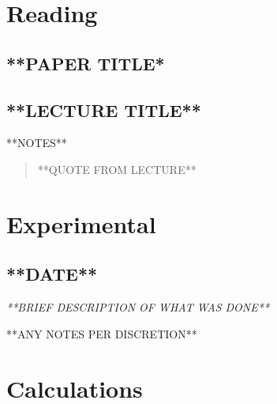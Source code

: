 \documentclass[]{article}
\begin{document}
        
\section{Reading}

    \begin{multicols*}{2}
        
    \subsection{**PAPER TITLE* \cite{hofstadter1976energy}}

    
    \subsection{**LECTURE TITLE** \cite{kim_2014}}

        **NOTES**

        \begin{quote}
            **QUOTE FROM LECTURE**
        \end{quote}


    \end{multicols*}


    \section{Experimental}

        \subsection{**DATE**}

            \textit{**BRIEF DESCRIPTION OF WHAT WAS DONE**}

            **ANY NOTES PER DISCRETION**

    \section{Calculations}
\end{document}
